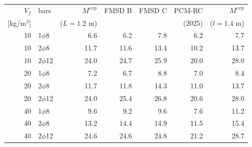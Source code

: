 \begin{tabular}{r l r r r r r}
\toprule
$V_f$ & bars & $M^{exp}$ & FMSD B & FMSD C & PCM-RC & $M^{exp}$\\
{[kg/m$^3$]} & & ($L=1.2$ m) & & & (2025) & ($l=1.4$ m)\\
\midrule
10 & 1$\phi$8 & 6.6 & 6.2 & 7.8 & 6.2 & 7.7\\
10 & 2$\phi$8 & 11.7 & 11.6 & 13.4 & 10.2 & 13.7\\
10 & 2$\phi$12 & 24.0 & 24.7 & 25.9 & 20.0 & 28.0\\
20 & 1$\phi$8 & 7.2 & 6.7 & 8.8 & 7.0 & 8.4\\
20 & 2$\phi$8 & 11.7 & 11.8 & 14.3 & 11.0 & 13.7\\
20 & 2$\phi$12 & 24.0 & 25.4 & 26.8 & 20.6 & 28.0\\
40 & 1$\phi$8 & 9.6 & 9.2 & 9.6 & 7.6 & 11.2\\
40 & 2$\phi$8 & 13.2 & 14.4 & 14.9 & 11.5 & 15.4\\
40 & 2$\phi$12 & 24.6 & 24.6 & 24.8 & 21.2 & 28.7\\
\bottomrule
\end{tabular}
